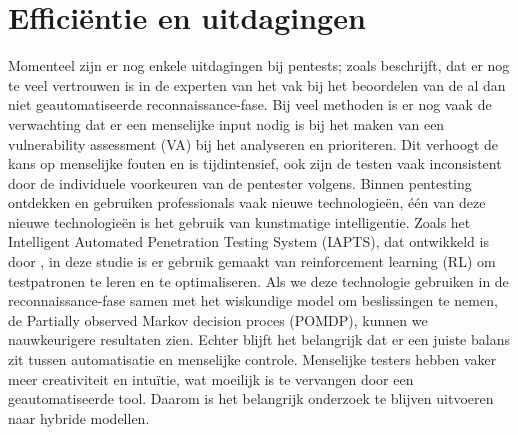 \section{Efficiëntie en uitdagingen}
Momenteel zijn er nog enkele uitdagingen bij pentests; zoals \textcite{21_Fugkeaw2023} beschrijft, dat er nog te veel vertrouwen is in de experten van het vak bij het beoordelen van de al dan niet geautomatiseerde reconnaissance-fase. Bij veel methoden is er nog vaak de verwachting dat er een menselijke input nodig is bij het maken van een vulnerability assessment (VA) bij het analyseren en prioriteren. Dit verhoogt de kans op menselijke fouten en is tijdintensief, ook zijn de testen vaak inconsistent door de individuele voorkeuren van de pentester volgens. \textcite{22_Ghanem2020} Binnen pentesting ontdekken en gebruiken professionals vaak nieuwe technologieën, één van deze nieuwe technologieën is het gebruik van kunstmatige intelligentie. Zoals het Intelligent Automated Penetration Testing System (IAPTS), dat ontwikkeld is door \textcite{22_Ghanem2020}, in deze studie is er gebruik gemaakt van reinforcement learning (RL) om testpatronen te leren en te optimaliseren. Als we deze technologie gebruiken in de reconnaissance-fase samen met het wiskundige model om beslissingen te nemen, de Partially observed Markov decision proces (POMDP), kunnen we nauwkeurigere resultaten zien. Echter blijft het belangrijk dat er een juiste balans zit tussen automatisatie en menselijke controle. Menselijke testers hebben vaker meer creativiteit en intuïtie, wat moeilijk is te vervangen door een geautomatiseerde tool. Daarom is het belangrijk onderzoek te blijven uitvoeren naar hybride modellen.


